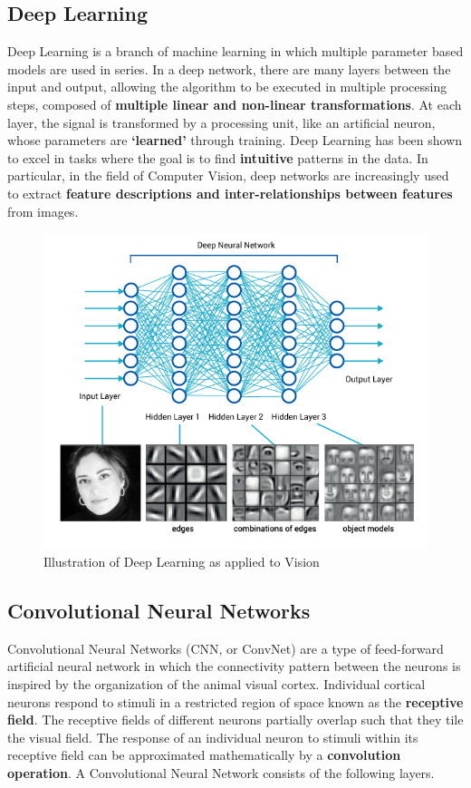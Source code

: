 \documentclass[11pt]{article}
\begin{document}
			\subsection{Deep Learning}
				Deep Learning is a branch of machine learning in which multiple parameter based models are used in series. In a deep network, there are many layers between the input and output, allowing the algorithm to be executed in multiple processing steps, composed of \textbf{multiple linear and non-linear transformations}. At each layer, the signal is transformed by a processing unit, like an artificial neuron, whose parameters are \textbf{`learned'} through training. Deep Learning has been shown to excel in tasks where the goal is to find \textbf{intuitive} patterns in the data.\cite{deep} In particular, in the field of Computer Vision, deep networks are increasingly used to extract \textbf{feature descriptions and inter-relationships between features} from images.\cite{cs231n}
				\begin{figure}[ht!]
					\includegraphics[width=14cm]{blog_deeplearning3.jpg}
					\caption{Illustration of Deep Learning as applied to Vision\label{fig2}}
				\end{figure}	

			\subsection{Convolutional Neural Networks}
			Convolutional Neural Networks (CNN, or ConvNet) are a type of feed-forward artificial neural network in which the connectivity pattern between the neurons is inspired by the organization of the animal visual cortex. Individual cortical neurons respond to stimuli in a restricted region of space known as the \textbf{receptive field}. The receptive fields of different neurons partially overlap such that they tile the visual field. The response of an individual neuron to stimuli within its receptive field can be approximated mathematically by a \textbf{convolution operation}. A Convolutional Neural Network consists of the following layers.\cite{showandtell}
								
\end{document}
